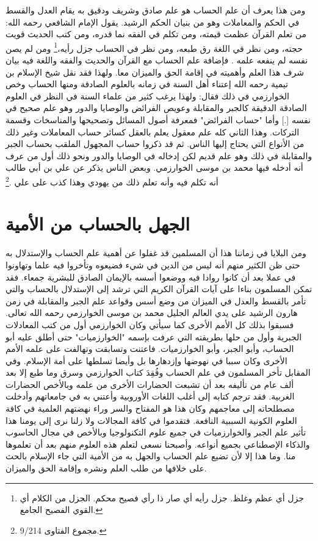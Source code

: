 ومن هذا يعرف أن علم الحساب هو علم صادق وشريف ودقيق به يقام العدل والقسط في الحكم والمعاملات وهو من بنيان الحكم الرشيد. يقول الإمام الشافعي رحمه الله: من تعلم القرآن عظمت قيمته، ومن تكلم في الفقه نما قدره، ومن كتب الحديث قويت حجته، ومن نظر في اللغة رق طبعه، ومن نظر في الحساب جزل رأيه،\footnote{جزل أي عظم وغلظ. جزل رأيه أي صار ذا رأي فصيح محكم. الجزل من الكلام أي القوي الفصيح الجامع.} ومن لم يصن نفسه لم ينفعه علمه \href{https://shamela.ws/book/22669/4471#p4}{\faExternalLink} \href{https://shamela.ws/book/10495/14224#p1}{\faExternalLink} \cite{dahabi_Siyar}. فإضافة علم الحساب مع القرآن والحديث والفقه واللغة فيه بيان شرف هذا العلم وأهميته في إقامة الحق والميزان معا. ولهذا فقد نقل شيخ الإسلام بن تيمية رحمه الله إعتناء أهل السنة في زمانه بالعلوم الصادقة ومنها الحساب وخص الخوارزمي في ذلك فقال: ولهذا يرغب كثير من علماء السنة في النظر في العلوم الصادقة الدقيقة كالجبر والمقابلة وعويص الفرائض والوصايا والدور وهو علم صحيح في نفسه [.] وأما "حساب الفرائض" فمعرفة أصول المسائل وتصحيحها والمناسخات وقسمة التركات. وهذا الثاني كله علم معقول يعلم بالعقل كسائر حساب المعاملات وغير ذلك من الأنواع التي يحتاج إليها الناس. ثم قد ذكروا حساب المجهول الملقب بحساب الجبر والمقابلة في ذلك وهو علم قديم لكن إدخاله في الوصايا والدور ونحو ذلك أول من عرف أنه أدخله فيها محمد بن موسى الخوارزمي. وبعض الناس يذكر عن علي بن أبي طالب أنه تكلم فيه وأنه تعلم ذلك من يهودي وهذا كذب على علي
\href{https://shamela.ws/book/7289/4478#p2}{\faExternalLink} \cite{ibnTaimia_Majmoo}.\footnote{مجموع الفتاوى 9/214.} 

\section{الجهل بالحساب من الأمية}

ومن البلايا في زماننا هذا أن المسلمين قد غفلوا عن أهمية علم الحساب والإستدلال به حتى ظن الكثير منهم أنه ليس من الدين في شيء فضيعوه وتأخروا فيه علما وتهاونوا في عملا بعد أن كانوا روادا فيه ووضعوا أسسه بالإيمان الصادق للبشرية جمعاء. فقد تمكن المسلمون  بناءا على آيات القرآن الكريم التي ترشد إلى الإستدلال بالحساب والتي تأمر بالقسط والعدل في الميزان من وضع أسس وقواعد علم الجبر والمقابلة في زمن هارون الرشيد على يدي العالم الجليل محمد بن موسى الخوارزمي رحمه الله تعالى. فسبقوا بذلك كل الأمم الأخرى كما سيأتي وكان الخوارزمي أول من كتب المعادلات الجبرية وأول من حلها بطريقته التي عرفت بإسمه "الخوارزميات" حتى أطلق عليه أبو الحساب، وأبو الجبر، وأبو الخوارزميات. فاعتنت وتسابقت وتهالفت على علمه الأمم الأخرى وكان سببا في نهوضها وإزدهارها بل وأيضا تسلطها على أمة الإسلام. وفي المقابل تأخر المسلمون في علم الحساب وفُقِدَ كتاب الخوارزمي وسرق وما طبع إلا بعد ألف عام من تأليفه بعد أن تشبعت الحضارات الأخرى من علمه وبالأخص الحضارات الغربية. فقد ترجم كتابه إلى أغلب اللغات الأوروبية وأعتني به في جامعاتهم وأدخلت مصطلحاته إلى معاجمهم وكان هذا هو المفتاح والسر وراء نهضتهم العلمية في كافة العلوم الكونية السببية النافعة. فتقدموا في كافة المجالات ولا زلنا نرى إلى يومنا هذا تأثير علم الجبر والخوارزميات في جميع علوم التكنولوجيا وبالأخص في مجال الحاسوب والذكاء الإصطناعي بجميع أنواعه. وأصبحنا نسعى لتعلم هذه العلوم منهم بعد أن تعلموها منا. وما هذا إلا لأن تضيع علم الحساب والجهل به من الأمية التي جاء الإسلام بالحث على خلافها من طلب العلم ونشره وإقامة الحق والميزان. 

